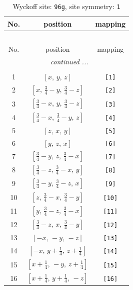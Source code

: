 \documentclass[fleqn,8pt]{jsarticle}
\begin{document}
\begin{longtable}{ccc}
\caption{Wyckoff site: {\tt 96g}, site symmetry: {\tt 1}}
 \\
 \hline \hline
No. & position & mapping \\ \hline \endfirsthead

\multicolumn{2}{l}{\tablename\ \thetable{}} \\
 \hline \hline
No. & position & mapping \\ \hline \endhead

 \hline \hline
\multicolumn{2}{r}{\footnotesize\it continued ...} \\ \endfoot

 \hline \hline
\multicolumn{2}{r}{} \\ \endlastfoot

1 & $\left[ x,\, y,\, z \right]$ & {\tt [1]} \\ \hline
2 & $\left[ x,\, \frac{3}{4} - y,\, \frac{3}{4} - z \right]$ & {\tt [2]} \\ \hline
3 & $\left[ \frac{3}{4} - x,\, y,\, \frac{3}{4} - z \right]$ & {\tt [3]} \\ \hline
4 & $\left[ \frac{3}{4} - x,\, \frac{3}{4} - y,\, z \right]$ & {\tt [4]} \\ \hline
5 & $\left[ z,\, x,\, y \right]$ & {\tt [5]} \\ \hline
6 & $\left[ y,\, z,\, x \right]$ & {\tt [6]} \\ \hline
7 & $\left[ \frac{3}{4} - y,\, z,\, \frac{3}{4} - x \right]$ & {\tt [7]} \\ \hline
8 & $\left[ \frac{3}{4} - z,\, \frac{3}{4} - x,\, y \right]$ & {\tt [8]} \\ \hline
9 & $\left[ \frac{3}{4} - y,\, \frac{3}{4} - z,\, x \right]$ & {\tt [9]} \\ \hline
10 & $\left[ z,\, \frac{3}{4} - x,\, \frac{3}{4} - y \right]$ & {\tt [10]} \\ \hline
11 & $\left[ y,\, \frac{3}{4} - z,\, \frac{3}{4} - x \right]$ & {\tt [11]} \\ \hline
12 & $\left[ \frac{3}{4} - z,\, x,\, \frac{3}{4} - y \right]$ & {\tt [12]} \\ \hline
13 & $\left[ - x,\, - y,\, - z \right]$ & {\tt [13]} \\ \hline
14 & $\left[ - x,\, y + \frac{1}{4},\, z + \frac{1}{4} \right]$ & {\tt [14]} \\ \hline
15 & $\left[ x + \frac{1}{4},\, - y,\, z + \frac{1}{4} \right]$ & {\tt [15]} \\ \hline
16 & $\left[ x + \frac{1}{4},\, y + \frac{1}{4},\, - z \right]$ & {\tt [16]} \\ \hline

\end{longtable}
\end{document}
